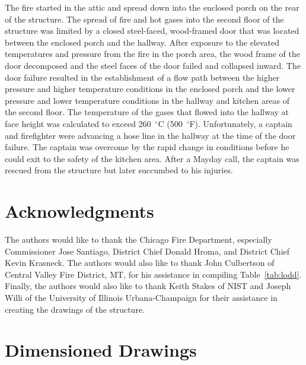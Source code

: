 \documentclass[12pt,oneside]{book}
\begin{document}
The fire started in the attic and spread down into the enclosed porch on the rear of the structure. The spread of fire and hot gases into the second floor of the structure was limited by a closed steel-faced, wood-framed door that was located between the enclosed porch and the hallway. After exposure to the elevated temperatures and pressure from the fire in the porch area, the wood frame of the door decomposed and the steel faces of the door failed and collapsed inward. The door failure resulted in the establishment of a flow path between the higher pressure and higher temperature conditions in the enclosed porch and the lower pressure and lower temperature conditions in the hallway and kitchen areas of the second floor. The temperature of the gases that flowed into the hallway at face height was calculated to exceed 260~$^{\circ}$C (500~$^{\circ}$F). Unfortunately, a captain and firefighter were advancing a hose line in the hallway at the time of the door failure. The captain was overcome by the rapid change in conditions before he could exit to the safety of the kitchen area. After a Mayday call, the captain was rescued from the structure but later succumbed to his injuries.


\chapter*{Acknowledgments}
The authors would like to thank the Chicago Fire Department, especially Commissioner Jose Santiago, District Chief Donald Hroma, and District Chief Kevin Krasneck. The authors would also like to thank John Culbertson of Central Valley Fire District, MT, for his assistance in compiling Table~\ref{tab:lodd}. Finally, the authors would also like to thank Keith Stakes of NIST and Joseph Willi of the University of Illinois Urbana-Champaign for their assistance in creating the drawings of the structure.




\appendix

\chapter{Dimensioned Drawings}
\label{app_draw}
\end{document}
